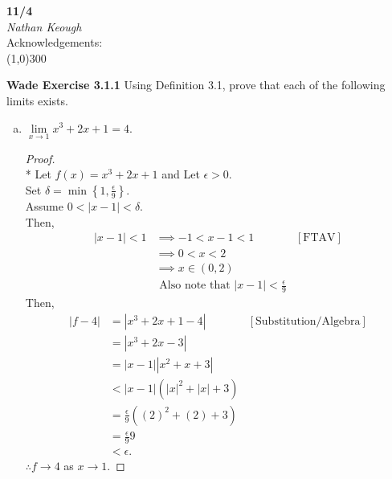 \documentclass[a4paper]{article}
\newcommand{\bb}{\textbf}
\newcommand{\eps}{\epsilon}
\newcommand{\del}{\delta}
\begin{document}
    \begin{center}
        \Large \textbf{11/4} \\
        \large \textit{Nathan Keough} \\
        Acknowledgements: \emph{} \vspace{.5pc} \\ \line(1,0){300} 
        \vspace{1pc}
    \end{center} 
    
    \begin{flushleft}


        \bb{Wade Exercise 3.1.1}
        Using Definition 3.1, prove that each of the following limits exists. \\
        \begin{enumerate}[c.]
            \item $\lim\limits_{x \to 1} x^3 + 2x + 1 = 4$.
            
            \begin{proof}\mbox{}\\*
                Let $f(x) = x^3 + 2x + 1$ and Let $\eps > 0$. \\ 
                Set $\del = \min\left\{1, \frac{\eps}{9}\right\}$. \\
                Assume $0 < \left| x - 1 \right| < \del $. \\
                Then, 
                \begin{align*}
                    |x-1| < 1 &\implies -1 < x-1 < 1 & [\text{FTAV}]\\
                    &\implies 0 < x < 2 &\\
                    &\implies x \in (0,2) &\\
                    &\text{  Also note that } |x-1|<\frac{\eps}{9}
                \end{align*}
                Then, 
                \begin{align*}
                    |f - 4| &= |x^3 +2x +1 - 4| & [\text{Substitution/Algebra}]\\
                            &= |x^3 +2x -3| \\
                            &= |x-1||x^2 + x + 3| \\
                            &< |x-1| (|x|^2 + |x| + 3) \\
                            &= \frac{\eps}{9} ({(2)}^2 + (2) + 3) \\
                            &= \frac{\eps}{9} 9 \\
                            &< \eps.
                \end{align*}
                $\therefore f \to 4$ as $x \to 1$.
            \end{proof}


\end{enumerate}
\end{flushleft}
\end{document}

